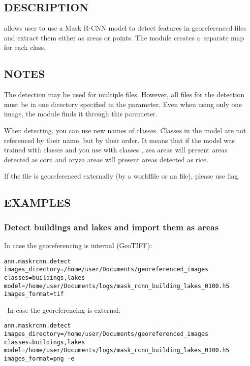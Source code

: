 \subsection*{DESCRIPTION}
 allows user to use a Mask R-CNN model to
detect features in georeferenced files and extract them either as areas or
points. The module creates a~separate map for each class. 

\subsection*{NOTES}
The detection may be used for multiple files. However, all files for the
detection must be in one directory specified in the
 parameter. Even when using only one
image, the module finds it through this parameter. 

When detecting, you can use new names of classes. Classes in the model are not
referenced by their name, but by their order. It means that if the model was
trained with classes  and you use
 with classes
, zea areas will present areas detected as corn
and oryza areas will present areas detected as rice. 

If the file is georeferenced externally (by a worldfile or an
 file), please use  flag. 

\subsection*{EXAMPLES}
\subsubsection*{Detect buildings and lakes and import them as areas}
In case the georeferencing is internal (GeoTIFF): 

\begin{lstlisting}[breaklines=true]
ann.maskrcnn.detect images_directory=/home/user/Documents/georeferenced_images classes=buildings,lakes model=/home/user/Documents/logs/mask_rcnn_building_lakes_0100.h5 images_format=tif
\end{lstlisting}

\ \linebreak In case the georeferencing is external: 

\begin{lstlisting}[breaklines=true]
ann.maskrcnn.detect images_directory=/home/user/Documents/georeferenced_images classes=buildings,lakes model=/home/user/Documents/logs/mask_rcnn_building_lakes_0100.h5 images_format=png -e
\end{lstlisting}


